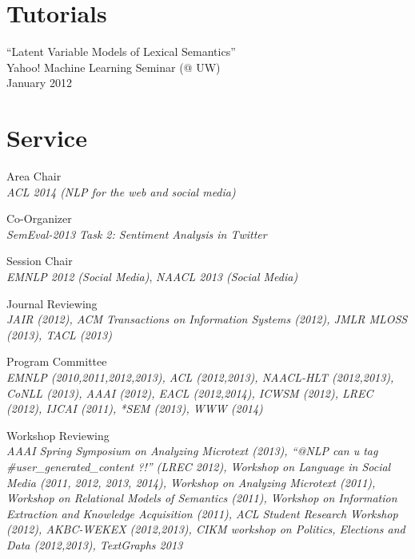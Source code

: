 \documentclass[margin,line]{res}
\begin{document}
\begin{resume}
\section{\sc Tutorials}
``Latent Variable Models of Lexical Semantics'' \\
Yahoo! Machine Learning Seminar (@ UW) \\
January 2012


\begin{comment}
``Profiling NAVDAS'' \\
Naval Research Laboratory Monterey, CA \\
August 2006

``Profiling Parallel Fortran/MPI programs using TAU'' (Training Class for NRL Scientists) \\
Naval Research Laboratory Monterey, CA \\
August 2006
\end{comment}

\section{\sc Service}
Area Chair \\
\emph{ACL 2014 (NLP for the web and social media)}

Co-Organizer \\
\emph{SemEval-2013 Task 2: Sentiment Analysis in Twitter}

Session Chair \\
\emph{EMNLP 2012 (Social Media)}, \emph{NAACL 2013 (Social Media)}

Journal Reviewing \\
\emph{JAIR (2012), ACM Transactions on Information Systems (2012), JMLR MLOSS (2013), TACL (2013)}

Program Committee \\
\emph{EMNLP (2010,2011,2012,2013), ACL (2012,2013), NAACL-HLT (2012,2013), CoNLL (2013), AAAI (2012), EACL (2012,2014), ICWSM (2012), LREC (2012), IJCAI (2011), *SEM (2013), WWW (2014)}

Workshop Reviewing \\
\emph{AAAI Spring Symposium on Analyzing Microtext (2013), ``@NLP can u tag \#user\_generated\_content ?!'' (LREC 2012), Workshop on Language in Social Media (2011, 2012, 2013, 2014), Workshop on Analyzing Microtext (2011), Workshop on Relational Models of Semantics (2011), Workshop on Information Extraction and Knowledge Acquisition (2011), ACL Student Research Workshop (2012), AKBC-WEKEX (2012,2013), CIKM workshop on Politics, Elections and Data (2012,2013), TextGraphs 2013}


\end{resume}
\end{document}
